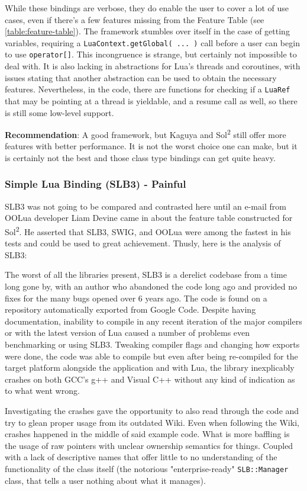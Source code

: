 \documentclass[conference,compsoc]{IEEEtran}
\newcommand{\soltwo}{Sol\textsuperscript{2}}
\begin{document}
While these bindings are verbose, they do enable the user to cover a lot of use cases, even if there's a few features missing from the Feature Table (see \cref{table:feature-table}). The framework stumbles over itself in the case of getting variables, requiring a \lstinline|LuaContext.getGlobal( ... )| call before a user can begin to use \lstinline|operator[]|. This incongruence is strange, but certainly not impossible to deal with. It is also lacking in abstractions for Lua's threads and coroutines, with issues stating that another abstraction can be used to obtain the necessary features. Nevertheless, in the code, there are functions for checking if a \lstinline|LuaRef| that may be pointing at a thread is yieldable, and a resume call as well, so there is still some low-level support.

\textbf{Recommendation}: A good framework, but Kaguya and \soltwo{} still offer more features with better performance. It is not the worst choice one can make, but it is certainly not the best and those class type bindings can get quite heavy.

\subsubsection{Simple Lua Binding (SLB3) - Painful}

SLB3 was not going to be compared and contrasted here until an e-mail from OOLua developer Liam Devine came in about the feature table constructed for \soltwo{}. He asserted that SLB3, SWIG, and OOLua were among the fastest in his tests and could be used to great achievement. Thusly, here is the analysis of SLB3:

The worst of all the libraries present, SLB3\cite{slb3} is a derelict codebase from a time long gone by, with an author who abandoned the code long ago and provided no fixes for the many bugs opened over 6 years ago. The code is found on a repository automatically exported from Google Code. Despite having documentation, inability to compile in any recent iteration of the major compilers or with the latest version of Lua caused a number of problems even benchmarking or using SLB3. Tweaking compiler flags and changing how exports were done, the code was able to compile but even after being re-compiled for the target platform alongside the application and with Lua, the library inexplicably crashes on both GCC's g++ and Visual C++ without any kind of indication as to what went wrong.

Investigating the crashes gave the opportunity to also read through the code and try to glean proper usage from its outdated Wiki. Even when following the Wiki, crashes happened in the middle of said example code. What is more baffling is the usage of raw pointers with unclear ownership semantics for things. Coupled with a lack of descriptive names that offer little to no understanding of the functionality of the class itself (the notorious "enterprise-ready" \lstinline|SLB::Manager| class, that tells a user nothing about what it manages).
\end{document}
